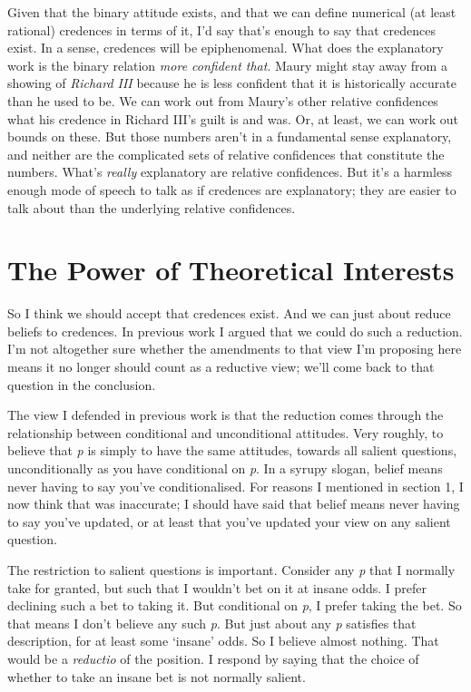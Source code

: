 \documentclass[
  11pt,
  letterpaper,
  DIV=11,
  numbers=noendperiod,
  twoside]{scrartcl}
\begin{document}
Given that the binary attitude exists, and that we can define numerical
(at least rational) credences in terms of it, I'd say that's enough to
say that credences exist. In a sense, credences will be epiphenomenal.
What does the explanatory work is the binary relation \emph{more
confident that}. Maury might stay away from a showing of \emph{Richard
III} because he is less confident that it is historically accurate than
he used to be. We can work out from Maury's other relative confidences
what his credence in Richard III's guilt is and was. Or, at least, we
can work out bounds on these. But those numbers aren't in a fundamental
sense explanatory, and neither are the complicated sets of relative
confidences that constitute the numbers. What's \emph{really}
explanatory are relative confidences. But it's a harmless enough mode of
speech to talk as if credences are explanatory; they are easier to talk
about than the underlying relative confidences.

\section{The Power of Theoretical
Interests}\label{the-power-of-theoretical-interests}

So I think we should accept that credences exist. And we can just about
reduce beliefs to credences. In previous work I argued that we could do
such a reduction. I'm not altogether sure whether the amendments to that
view I'm proposing here means it no longer should count as a reductive
view; we'll come back to that question in the conclusion.

The view I defended in previous work is that the reduction comes through
the relationship between conditional and unconditional attitudes. Very
roughly, to believe that \emph{p} is simply to have the same attitudes,
towards all salient questions, unconditionally as you have conditional
on \emph{p}. In a syrupy slogan, belief means never having to say you've
conditionalised. For reasons I mentioned in section 1, I now think that
was inaccurate; I should have said that belief means never having to say
you've updated, or at least that you've updated your view on any salient
question.

The restriction to salient questions is important. Consider any \emph{p}
that I normally take for granted, but such that I wouldn't bet on it at
insane odds. I prefer declining such a bet to taking it. But conditional
on \emph{p}, I prefer taking the bet. So that means I don't believe any
such \emph{p}. But just about any \emph{p} satisfies that description,
for at least some `insane' odds. So I believe almost nothing. That would
be a \emph{reductio} of the position. I respond by saying that the
choice of whether to take an insane bet is not normally salient.
\end{document}
